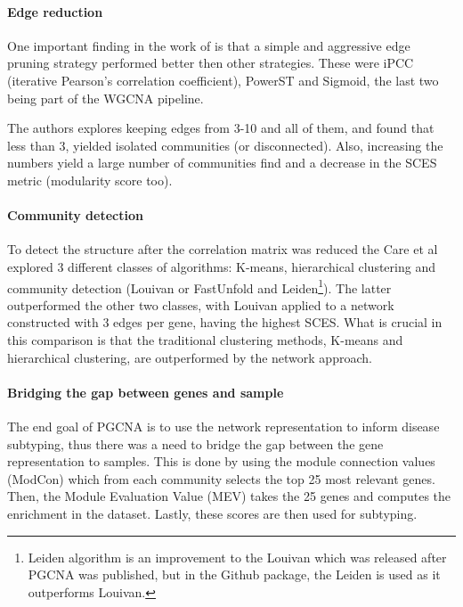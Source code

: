 \paragraph{Edge reduction}

One important finding in the work of \citet{Care2019-ij} is that a simple and aggressive edge pruning strategy performed better then other strategies. These were iPCC (iterative Pearson’s correlation coefficient), PowerST and Sigmoid, the last two being part of the WGCNA pipeline.

The authors explores keeping edges from 3-10 and all of them, and found that less than 3, yielded isolated communities (or disconnected). Also, increasing the numbers yield a large number of communities find and a decrease in the SCES metric (modularity score too).

\paragraph{Community detection}

To detect the structure after the correlation matrix was reduced the Care et al explored 3 different classes of algorithms: K-means, hierarchical clustering and community detection (Louivan\citet{Blondel2008-ik} or FastUnfold and Leiden\citet{Traag2019-ne}\footnote{Leiden algorithm is an improvement to the Louivan which was released after PGCNA was published, but in the Github package, the Leiden is used as it outperforms Louivan.}). The latter outperformed the other two classes, with Louivan applied to a network constructed with 3 edges per gene, having the highest SCES. What is crucial in this comparison is that the traditional clustering methods, K-means and hierarchical clustering, are outperformed by the network approach.

\paragraph{Bridging the gap between genes and sample}

The end goal of PGCNA is to use the network representation to inform disease subtyping, thus there was a need to bridge the gap between the gene representation to samples. This is done by using the module connection values (ModCon) which from each community selects the top 25 most relevant genes. Then, the Module Evaluation Value (MEV) takes the 25 genes and computes the enrichment in the dataset. Lastly, these scores are then used for subtyping.


